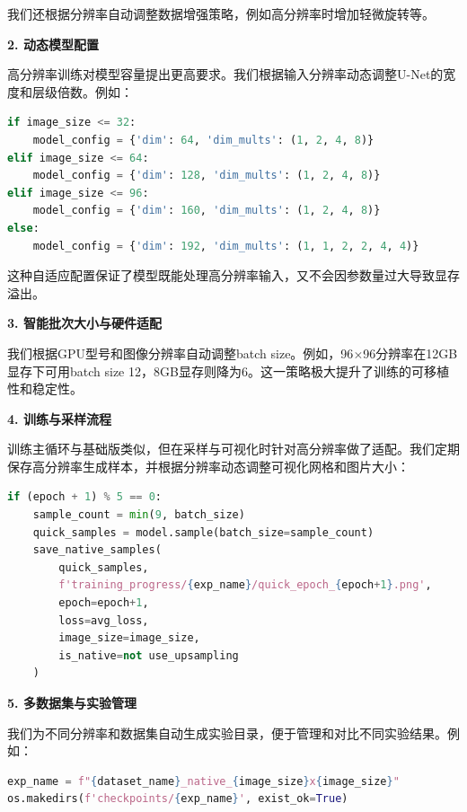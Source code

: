 \documentclass{ctexart}
\begin{document}
\noindent
我们还根据分辨率自动调整数据增强策略，例如高分辨率时增加轻微旋转等。

\vspace{0.5em}
\noindent
\textbf{2. 动态模型配置}

\noindent
高分辨率训练对模型容量提出更高要求。我们根据输入分辨率动态调整U-Net的宽度和层级倍数。例如：

\begin{lstlisting}[language=python]
if image_size <= 32:
    model_config = {'dim': 64, 'dim_mults': (1, 2, 4, 8)}
elif image_size <= 64:
    model_config = {'dim': 128, 'dim_mults': (1, 2, 4, 8)}
elif image_size <= 96:
    model_config = {'dim': 160, 'dim_mults': (1, 2, 4, 8)}
else:
    model_config = {'dim': 192, 'dim_mults': (1, 1, 2, 2, 4, 4)}
\end{lstlisting}
\noindent
这种自适应配置保证了模型既能处理高分辨率输入，又不会因参数量过大导致显存溢出。

\vspace{0.5em}
\noindent
\textbf{3. 智能批次大小与硬件适配}

\noindent
我们根据GPU型号和图像分辨率自动调整batch size。例如，96$\times$96分辨率在12GB显存下可用batch size 12，8GB显存则降为6。这一策略极大提升了训练的可移植性和稳定性。

\vspace{0.5em}
\noindent
\textbf{4. 训练与采样流程}

\noindent
训练主循环与基础版类似，但在采样与可视化时针对高分辨率做了适配。我们定期保存高分辨率生成样本，并根据分辨率动态调整可视化网格和图片大小：

\begin{lstlisting}[language=python]
if (epoch + 1) % 5 == 0:
    sample_count = min(9, batch_size)
    quick_samples = model.sample(batch_size=sample_count)
    save_native_samples(
        quick_samples,
        f'training_progress/{exp_name}/quick_epoch_{epoch+1}.png',
        epoch=epoch+1,
        loss=avg_loss,
        image_size=image_size,
        is_native=not use_upsampling
    )
\end{lstlisting}

\vspace{0.5em}
\noindent
\textbf{5. 多数据集与实验管理}

\noindent
我们为不同分辨率和数据集自动生成实验目录，便于管理和对比不同实验结果。例如：

\begin{lstlisting}[language=python]
exp_name = f"{dataset_name}_native_{image_size}x{image_size}"
os.makedirs(f'checkpoints/{exp_name}', exist_ok=True)
\end{lstlisting}
\end{document}
